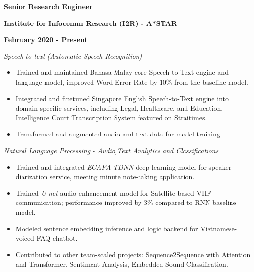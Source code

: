 \documentclass[10pt]{article}
\begin{document}
        \begin{multicols}{3}
            \begin{flushleft}
                \textbf{Senior Research Engineer}
            \end{flushleft}

            \columnbreak

            \begin{center}
                \textbf{Institute for Infocomm Research (I2R) - A*STAR}
            \end{center}

            \columnbreak

            \begin{flushright}
                \textbf{February 2020 - Present}
            \end{flushright}
        \end{multicols}

        \vspace{-5mm}
        \emph{Speech-to-text (Automatic Speech Recognition)}
        \vspace{-2.5mm}
        \begin{itemize}[noitemsep]
            \item Trained and maintained Bahasa Malay core Speech-to-Text engine and language model, improved Word-Error-Rate by 10\% from the baseline model.
            \item Integrated and finetuned Singapore English Speech-to-Text engine into domain-specific services, including Legal, Healthcare, and Education. \href{https://www.straitstimes.com/singapore/courts-crime/state-courts-to-use-system-that-instantly-transcribes-court-proceedings}{Intelligence Court Transcription System} featured on Straitimes.
            \item Transformed and augmented audio and text data for model training.
        \end{itemize}

        \emph{Natural Language Processing - Audio,Text Analytics and Classifications}
        \vspace{-2.5mm}
        \begin{itemize}[noitemsep]
            \item Trained and integrated \emph{ECAPA-TDNN} deep learning model for speaker diarization service, meeting minute note-taking application.
            \item Trained \emph{U-net} audio enhancement model for Satellite-based VHF communication; performance improved by 3\% compared to RNN baseline model.
            \item Modeled sentence embedding inference and logic backend for Vietnamese-voiced FAQ chatbot.
            \item Contributed to other team-scaled projects: Sequence2Sequence with Attention and Transformer, Sentiment Analysis, Embedded Sound Classification.
        \end{itemize}
\end{document}
